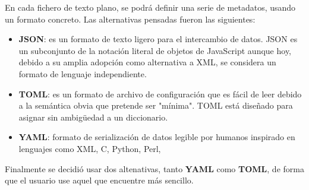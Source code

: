 En cada fichero de texto plano, se podrá definir una serie de metadatos, usando un formato concreto. Las alternativas pensadas fueron 
las siguientes:

\begin{itemize}
\item \textbf{JSON}: es un formato de texto ligero para el intercambio de datos. JSON es un subconjunto de la notación literal de 
objetos de JavaScript aunque hoy, debido a su amplia adopción como alternativa a XML, se considera un formato de lenguaje independiente.
\item \textbf{TOML}: es un formato de archivo de configuración que es fácil de leer debido a la semántica obvia que pretende ser 
"mínima". TOML está diseñado para asignar sin ambigüedad a un diccionario.
\item \textbf{YAML}: formato de serialización de datos legible por humanos inspirado en lenguajes como XML, C, Python, Perl,
\end{itemize}


Finalmente se decidió usar dos altenativas, tanto \textbf{YAML} como \textbf{TOML}, de forma que el usuario use aquel que encuentre más
sencillo.
